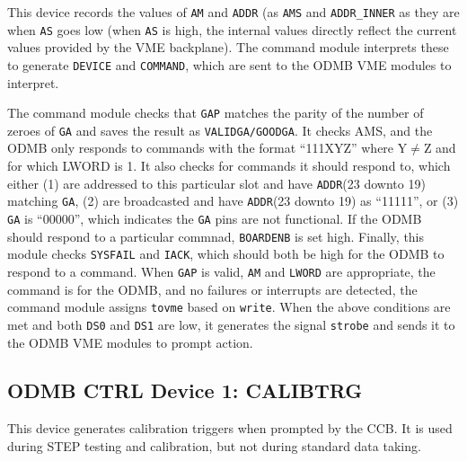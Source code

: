 \documentclass[10pt,a4paper]{article}
\begin{document}
This device records the values of \texttt{AM} and \texttt{ADDR} (as \texttt{AMS} and \texttt{ADDR\_INNER} as they are when \texttt{AS} goes low (when \texttt{AS} is high, the internal values directly reflect the current values provided by the VME backplane). The command module interprets these to generate \texttt{DEVICE} and \texttt{COMMAND}, which are sent to the ODMB VME modules to interpret.

The command module checks that \texttt{GAP} matches the parity of the number of zeroes of \texttt{GA} and saves the result as \texttt{VALIDGA/GOODGA}. It checks AMS, and the ODMB only responds to commands with the format ``111XYZ'' where Y$\neq$Z and for which LWORD is 1. It also checks for commands it should respond to, which either (1) are addressed to this particular slot and have \texttt{ADDR}(23 downto 19) matching \texttt{GA}, (2) are broadcasted and have \texttt{ADDR}(23 downto 19) as ``11111'', or (3) \texttt{GA} is ``00000'', which indicates the \texttt{GA} pins are not functional. If the ODMB should respond to a particular commnad, \texttt{BOARDENB} is set high. Finally, this module checks \texttt{SYSFAIL} and \texttt{IACK}, which should both be high for the ODMB to respond to a command. When \texttt{GAP} is valid, \texttt{AM} and \texttt{LWORD} are appropriate, the command is for the ODMB, and no failures or interrupts are detected, the command module assigns \texttt{tovme} based on \texttt{write}. When the above conditions are met and both \texttt{DS0} and \texttt{DS1} are low, it generates the signal \texttt{strobe} and sends it to the ODMB VME modules to prompt action.

\subsection{ODMB CTRL Device 1: CALIBTRG}

This device generates calibration triggers when prompted by the CCB. It is used during STEP testing and calibration, but not during standard data taking. 
\end{document}
